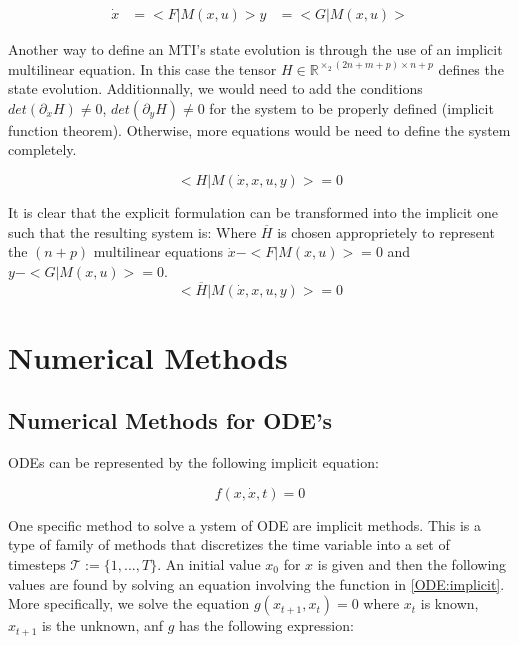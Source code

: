 \documentclass{article}
\begin{document}
{\begin{align}
    \dot{x} &= <F|M(x,u)>
    y &= <G|M(x,u)>
\end{align}

Another way to define an MTI's state evolution is through the use of an implicit multilinear equation.
In this case the tensor $H \in \mathbb{R}^{\times_2 (2n+m+p) \times n+p}$ defines the state evolution. 
Additionnally, we would need to add the conditions $det(\partial_{\dot{x}} H) \neq 0$, $det(\partial_y H) \neq 0$ 
for the system to be properly defined (implicit function theorem). Otherwise, more equations would be need to 
define the system completely.

\begin{equation}
    <H| M(\dot{x}, x, u, y)> = 0
\end{equation}

It is clear that the explicit formulation can be transformed into the implicit one such that the resulting system is:
Where $\overline{H}$ is chosen approprietely to represent the $(n+p)$ multilinear equations $\dot{x} - <F|M(x,u)> = 0$
and $y - <G|M(x,u)> = 0$.
\begin{equation}
    <\overline{H}| M(\dot{x}, x, u, y)> = 0
\end{equation}

\section{Numerical Methods}

\subsection{Numerical Methods for ODE's}

ODEs can be represented by the following implicit equation:

\begin{equation}\label{ODE:implicit}
    f(x, \dot{x}, t) = 0
\end{equation}

One specific method to solve a ystem of ODE are implicit methods. 
This is a type of family of methods that discretizes the time variable into a set of timesteps
$\mathcal{T}:=\{1,...,T\}$. An initial value $x_0$ for $x$ is given and then the following values are 
found by solving an equation involving the function in \ref{ODE:implicit}. 
More specifically, we solve the equation $g(x_{t+1}, x_t) = 0$ where $x_t$ is known, $x_{t+1}$ is the unknown,
anf $g$ has the following expression:

}
\end{document}
